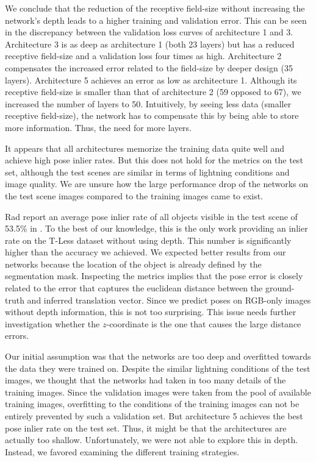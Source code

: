 We conclude that the reduction of the receptive field-size without increasing the network's depth leads to a higher training and validation error. This can be seen in the discrepancy between the validation loss curves of architecture 1 and 3. Architecture 3 is as deep as architecture 1 (both 23 layers) but has a reduced receptive field-size and a validation loss four times as high. Architecture 2 compensates the increased error related to the field-size by deeper design (35 layers). Architecture 5 achieves an error as low as architecture 1. Although its receptive field-size is smaller than that of architecture 2 (59 opposed to 67), we increased the number of layers to 50. Intuitively, by seeing less data (smaller receptive field-size), the network has to compensate this by being able to store more information. Thus, the need for more layers.

It appears that all architectures memorize the training data quite well and achieve high pose inlier rates. But this does not hold for the metrics on the test set, although the test scenes are similar in terms of lightning conditions and image quality. We are unsure how the large performance drop of the networks on the test scene images compared to the training images came to exist.

Rad \etal report an average pose inlier rate of all objects visible in the test scene of 53.5\% in \cite{bb8}. To the best of our knowledge, this is the only work providing an inlier rate on the T-Less dataset without using depth. This number is significantly higher than the accuracy we achieved. We expected better results from our networks because the location of the object is already defined by the segmentation mask. Inspecting the metrics implies that the pose error is closely related to the error that captures the euclidean distance between the ground-truth and inferred translation vector. Since we predict poses on RGB-only images without depth information, this is not too surprising. This issue needs further investigation whether the $z$-coordinate is the one that causes the large distance errors.

Our initial assumption was that the networks are too deep and overfitted towards the data they were trained on. Despite the similar lightning conditions of the test images, we thought that the networks had taken in too many details of the training images. Since the validation images were taken from the pool of available training images, overfitting to the conditions of the training images can not be entirely prevented by such a validation set. But architecture 5 achieves the best pose inlier rate on the test set. Thus, it might be that the architectures are actually too shallow. Unfortunately, we were not able to explore this in depth. Instead, we favored examining the different training strategies.

